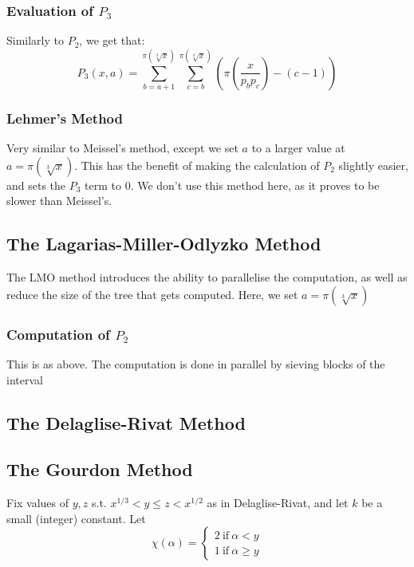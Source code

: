 \documentclass[12pt]{article}
\begin{document}
\subsubsection*{Evaluation of $P_3$}
Similarly to $P_2$, we get that:
\begin{equation*}
  P_3(x,a)
    =\sum_{b=a+1}^{\pi(\sqrt[3]{x})}\sum_{c=b}^{\pi(\sqrt[3]{x})}\left(\pi\left(\frac{x}{p_bp_c}\right) - (c - 1)\right)
  \end{equation*}

\subsubsection{Lehmer's Method}
Very similar to Meissel's method, except we set $a$ to a larger value at $a=\pi\left(\sqrt[3]{x}\right)$. This
has the benefit of making the calculation of $P_2$ slightly easier, and sets the $P_3$ term to 0. We don't
use this method here, as it proves to be slower than Meissel's.

\subsection{The Lagarias-Miller-Odlyzko Method}
The LMO method introduces the ability to parallelise the computation, as well as reduce the size
of the tree that gets computed. Here, we set $a=\pi\left(\sqrt[3]{x}\right)$

\subsubsection{Computation of $P_2$}
This is as above. The computation is done in parallel by sieving blocks of the interval 

\subsection{The Delaglise-Rivat Method}

\subsection{The Gourdon Method}
Fix values of $y,z$ s.t. $x^{1/3} < y \leq z < x^{1/2}$ as in Delaglise-Rivat, and let $k$ be a small (integer) constant. Let
\begin{equation*}
  \chi(\alpha) =
    \begin{cases}
      2\ \mathrm{if}\ \alpha < y\\
      1\ \mathrm{if}\ \alpha \geq y
    \end{cases}
\end{equation*}
\end{document}
